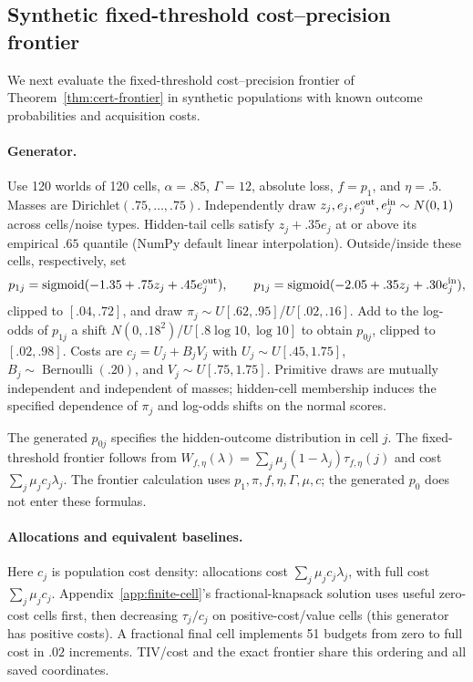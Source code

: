 \FloatBarrier
\begin{samepage}
\subsection{Synthetic fixed-threshold cost--precision frontier}
\label{app:frontier-experiments}

We next evaluate the fixed-threshold cost--precision frontier of Theorem~\ref{thm:cert-frontier} in synthetic populations with known outcome probabilities and acquisition costs.

\end{samepage}

\begin{samepage}
\paragraph{Generator.}
Use 120 worlds of 120 cells, $\alpha=.85$, $\Gamma=12$, absolute loss,
$f=p_1$, and $\eta=.5$. Masses are Dirichlet$(.75,\ldots,.75)$.
Independently draw $z_j,e_j,e_j^{\rm out},e_j^{\rm in}\sim N(0,1)$ across
cells/noise types. Hidden-tail cells satisfy $z_j+.35e_j$ at or above its
empirical $.65$ quantile (NumPy default linear interpolation). Outside/inside
these cells, respectively, set
\[
p_{1j}=\operatorname{sigmoid}(-1.35+.75z_j+.45e_j^{\rm out}),\qquad
p_{1j}=\operatorname{sigmoid}(-2.05+.35z_j+.30e_j^{\rm in}),
\]
clipped to $[.04,.72]$, and draw $\pi_j\sim U[.62,.95]$/$U[.02,.16]$.
Add to the log-odds of $p_{1j}$ a shift $N(0,.18^2)$/$U[.8\log10,\log10]$
to obtain $p_{0j}$, clipped to $[.02,.98]$. Costs are $c_j=U_j+B_jV_j$ with
$U_j\sim U[.45,1.75]$, $B_j\sim\operatorname{Bernoulli}(.20)$, and
$V_j\sim U[.75,1.75]$. Primitive draws are mutually independent and independent
of masses; hidden-cell membership induces the specified dependence of $\pi_j$
and log-odds shifts on the normal scores.

\end{samepage}

The generated $p_{0j}$ specifies the hidden-outcome distribution in cell $j$. The
fixed-threshold frontier follows from
$W_{f,\eta}(\lambda)=\sum_j\mu_j(1-\lambda_j)\tau_{f,\eta}(j)$ and cost
$\sum_j\mu_jc_j\lambda_j$. The frontier calculation uses $p_1,\pi,f,\eta,\Gamma,\mu,c$; the
generated $p_0$ does not enter these formulas.

\paragraph{Allocations and equivalent baselines.}
Here $c_j$ is population cost density: allocations cost
$\sum_j\mu_jc_j\lambda_j$, with full cost $\sum_j\mu_jc_j$.
Appendix~\ref{app:finite-cell}'s fractional-knapsack solution uses useful
zero-cost cells first, then decreasing $\tau_j/c_j$ on positive-cost/value
cells (this generator has positive costs). A fractional final cell implements
51 budgets from zero to full cost in $.02$ increments. TIV/cost and the exact
frontier share this ordering and all saved coordinates.

